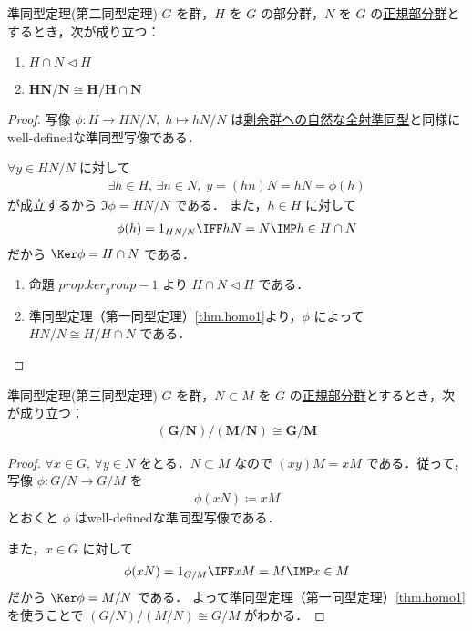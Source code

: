 \documentclass[geometry_main]{subfiles}
\begin{document}
\begin{mytheo}[label=thm.homo2]{準同型定理(第二同型定理)}
	$G$ を群，$H$ を $G$ の部分群，$N$ を $G$ の\hyperref[def.subgroup_normal]{正規部分群}とするとき，次が成り立つ：
	\begin{enumerate}
		\item $H \cap N \vartriangleleft H$
		\item $\bm{HN/N \cong H/H\cap N}$
	\end{enumerate}
\end{mytheo}

\begin{proof}
	写像 $\phi \colon H \to HN/N,\; h \mapsto hN/N$ は\hyperref[natural-homo]{剰余群への自然な全射準同型}と同様にwell-definedな準同型写像である．
	
	$\forall y \in HN/N$ に対して
	\begin{align}
		\exists h \in H,\, \exists n \in N,\; y= (hn)N = hN = \phi(h)
	\end{align}
	が成立するから $\Im \phi = HN/N$ である．
	また，$h \in H$ に対して
	\begin{align}
		\phi(h) = 1_{HN/N} \IFF hN = N \IMP h \in H \cap N
	\end{align}
	だから $\Ker \phi = H \cap N$ である．
	\begin{enumerate}
		\item 命題 $prop.ker_group-1$ より $H \cap N \vartriangleleft H$ である．
		\item 準同型定理（第一同型定理）\ref{thm.homo1}より，$\phi$ によって $HN/N \cong H/H\cap N$ である．
	\end{enumerate}
\end{proof}

\begin{mytheo}[label=thm.homo3]{準同型定理(第三同型定理)}
	$G$ を群，$N \subset M$ を $G$ の\hyperref[def.subgroup_normal]{正規部分群}とするとき，次が成り立つ：
	\begin{align}
		\bm{(G/N)/(M/N) \cong G/M}
	\end{align}
\end{mytheo}

\begin{proof}
	$\forall x \in G,\, \forall y \in N$ をとる．$N \subset M$ なので $(xy) M = xM$ である．従って，写像 $\phi \colon G/N \to G/M$ を
	\begin{align}
		\phi(xN) \coloneqq xM
	\end{align}
	とおくと $\phi$ はwell-definedな準同型写像である．

	また，$x \in G$ に対して
	\begin{align}
		\phi (xN) = 1_{G/M} \IFF xM = M \IMP x \in M
	\end{align}
	だから $\Ker \phi = M/N$ である．
	よって準同型定理（第一同型定理）\ref{thm.homo1}を使うことで $(G/N)/(M/N) \cong G/M$ がわかる．
\end{proof}
\end{document}
